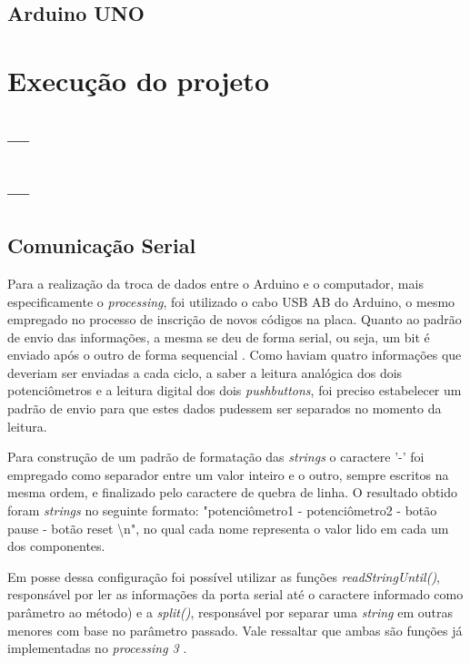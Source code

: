 \documentclass[conference]{IEEEtran}
\begin{document}
\subsection{Arduino UNO}


\section{Execução do projeto}

\subsection{---}\label{AA}


\subsection{---}

\subsection{Comunicação Serial}
Para a realização da troca de dados entre o Arduino e o computador, mais especificamente o \emph{processing}, foi utilizado o cabo USB AB do Arduino, o mesmo empregado no processo de inscrição de novos códigos na placa. Quanto ao padrão de envio das informações, a mesma se deu de forma serial, ou seja, um bit é enviado após o outro de forma sequencial \cite{ArduinoHomepage}. Como haviam quatro informações que deveriam ser enviadas a cada ciclo, a saber a leitura analógica dos dois potenciômetros e a leitura digital dos dois \emph{pushbuttons}, foi preciso estabelecer um padrão de envio para que estes dados pudessem ser separados no momento da leitura. 

Para construção de um padrão de formatação das \emph{strings} o caractere '-' foi empregado como separador entre um valor inteiro e o outro, sempre escritos na mesma ordem, e finalizado pelo caractere de quebra de linha. O resultado obtido foram \emph{strings} no seguinte formato: "potenciômetro1 - potenciômetro2 - botão pause - botão reset \textbackslash n", no qual cada nome representa o valor lido em cada um dos componentes.

Em posse dessa configuração foi possível utilizar as funções \emph{readStringUntil()}, responsável por ler as informações da porta serial até o caractere informado como parâmetro ao método) e a \emph{split()}, responsável por separar uma \emph{string} em outras menores com base no parâmetro passado. Vale ressaltar que ambas são funções já implementadas no \emph{processing 3} \cite{ProcessingHomepage}.
\end{document}

